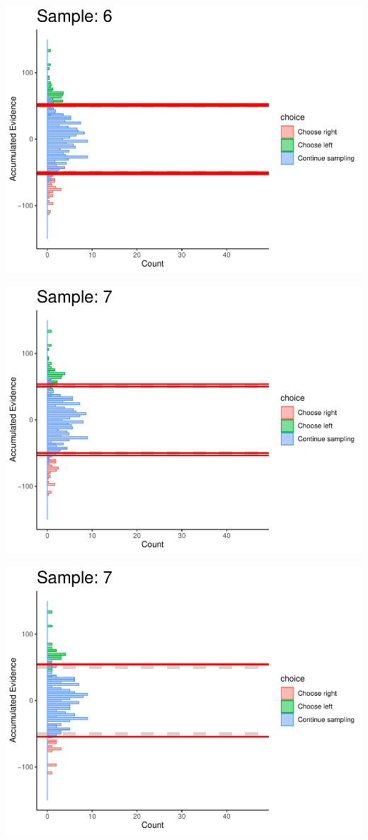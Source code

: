 \documentclass[
]{book}
\begin{document}
\begin{center}\includegraphics[width=0.8\linewidth]{LateNightBayes_files/figure-latex/fixed_dcb-58} \end{center}

\begin{center}\includegraphics[width=0.8\linewidth]{LateNightBayes_files/figure-latex/fixed_dcb-59} \end{center}

\begin{center}\includegraphics[width=0.8\linewidth]{LateNightBayes_files/figure-latex/fixed_dcb-60} \end{center}
\end{document}
